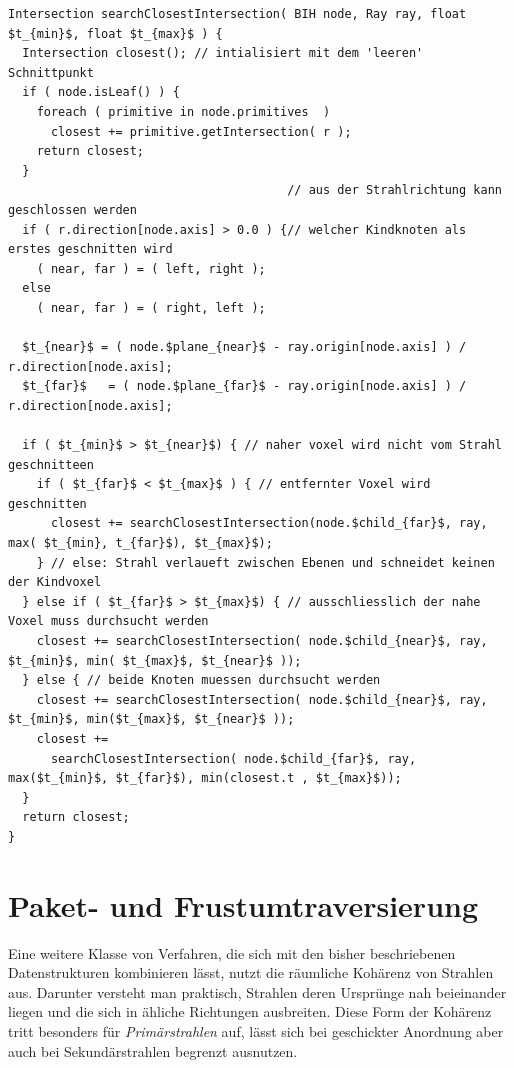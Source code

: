 \begin{lstlisting}[belowcaptionskip=8pt,float,mathescape=true,caption={[Traversierung der Bounding Interval Hierarchy]Traversierung der BIH. Der += Operator weißt nur dann zu wenn der rechte Operand einen kleineres t aufweist als der linke.},label=travbih]
Intersection searchClosestIntersection( BIH node, Ray ray, float $t_{min}$, float $t_{max}$ ) {
  Intersection closest(); // intialisiert mit dem 'leeren' Schnittpunkt
  if ( node.isLeaf() ) {
    foreach ( primitive in node.primitives  )
      closest += primitive.getIntersection( r );
    return closest;
  }
                                       // aus der Strahlrichtung kann geschlossen werden
  if ( r.direction[node.axis] > 0.0 ) {// welcher Kindknoten als erstes geschnitten wird
    ( near, far ) = ( left, right );
  else 
    ( near, far ) = ( right, left );

  $t_{near}$ = ( node.$plane_{near}$ - ray.origin[node.axis] ) / r.direction[node.axis];
  $t_{far}$   = ( node.$plane_{far}$ - ray.origin[node.axis] ) / r.direction[node.axis];

  if ( $t_{min}$ > $t_{near}$) { // naher voxel wird nicht vom Strahl geschnitteen
    if ( $t_{far}$ < $t_{max}$ ) { // entfernter Voxel wird geschnitten
      closest += searchClosestIntersection(node.$child_{far}$, ray, max( $t_{min}, t_{far}$), $t_{max}$);
    } // else: Strahl verlaueft zwischen Ebenen und schneidet keinen der Kindvoxel
  } else if ( $t_{far}$ > $t_{max}$) { // ausschliesslich der nahe Voxel muss durchsucht werden
    closest += searchClosestIntersection( node.$child_{near}$, ray, $t_{min}$, min( $t_{max}$, $t_{near}$ ));
  } else { // beide Knoten muessen durchsucht werden
    closest += searchClosestIntersection( node.$child_{near}$, ray, $t_{min}$, min($t_{max}$, $t_{near}$ ));
    closest += 
      searchClosestIntersection( node.$child_{far}$, ray, max($t_{min}$, $t_{far}$), min(closest.t , $t_{max}$));
  }
  return closest;
}
\end{lstlisting}

\section{Paket- und Frustumtraversierung}
\label{sec:packets}
Eine weitere Klasse von Verfahren, die sich mit den bisher beschriebenen Datenstrukturen kombinieren lässt, nutzt die räumliche Kohärenz von Strahlen aus. Darunter versteht man praktisch, Strahlen deren Ursprünge nah beieinander liegen und die sich in ähliche Richtungen ausbreiten. Diese Form der Kohärenz tritt besonders für \textit{Primärstrahlen} auf, lässt sich bei geschickter Anordnung aber auch bei Sekundärstrahlen begrenzt ausnutzen.

